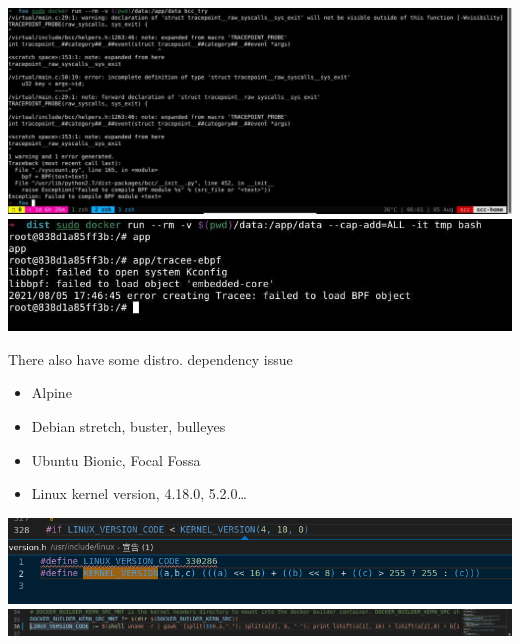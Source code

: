 \documentclass{beamer}
\begin{document}
\begin{CJK*}{UTF8}{bsmi}
  \begin{frame}
    \includegraphics[height=.5\textheight]{photo_2021-08-05_06-02-50.jpg}
    \includegraphics[height=.5\textheight]{photo_2021-08-06_02-08-38.jpg}
  \end{frame}

  \begin{frame}{There also have some distro. dependency issue}
    \begin{itemize}
      \item Alpine
      \item Debian stretch, buster, bulleyes
      \item Ubuntu Bionic, Focal Fossa
      \item Linux kernel version, 4.18.0, 5.2.0\dots
    \end{itemize}
    \includegraphics[width=\textwidth]{Screenshot_2021-08-06_06-44-54.png}
    \includegraphics[width=\textwidth]{Screenshot_2021-08-06_06-46-24.png}
  \end{frame}

\end{CJK*}
\end{document}
